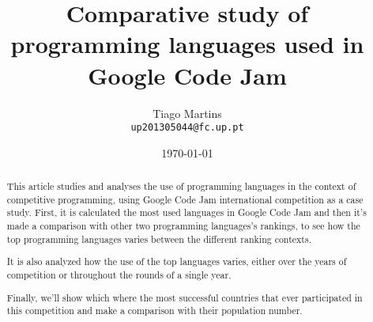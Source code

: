 \documentclass{article}
\begin{document}
\title{Comparative study of programming languages used in Google Code Jam}

\author{Tiago Martins\\ \texttt{up201305044@fc.up.pt} \\
}

\date{\today}

\maketitle


\begin{abstract}

This article studies and analyses the use of programming languages in the context of competitive programming, using Google Code Jam international competition as a case study. First, it is calculated the most used languages in Google Code Jam and then it's made a comparison with other two programming languages's rankings, to see how the top programming languages varies between the different ranking contexts.

It is also analyzed how the use of the top languages varies, either over the years of competition or throughout the rounds of a single year.

Finally, we'll show which where the most successful countries that ever participated in this competition and make a comparison with their population number.


\vspace{5mm}
\end{abstract}

\end{document}
